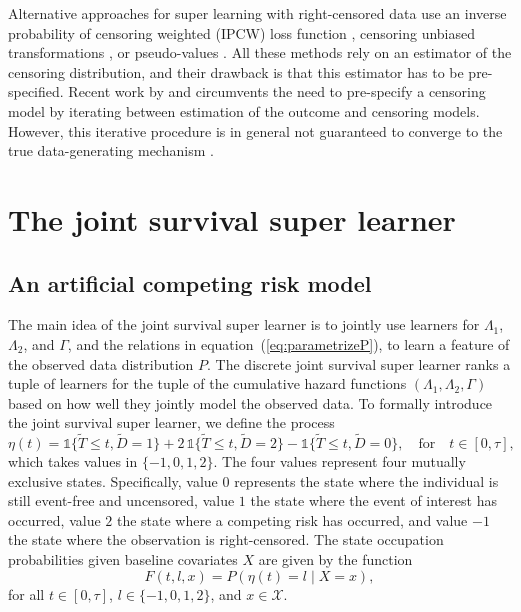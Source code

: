 \documentclass[a4paper,danish]{article}
\theoremstyle{plain} %
\numberwithin{theorem}{section}
\theoremstyle{definition} %
\theoremstyle{remark}
\newcommand{\1}{\mathds{1}}
\begin{document}
Alternative approaches for super learning with right-censored data use
an inverse probability of censoring weighted (IPCW) loss function
\citep{graf1999assessment,van2003unicv,molinaro2004tree,keles2004asymptotically,hothorn2006survival,gerds2006consistent,gonzalez2021stacked},
censoring unbiased transformations
\citep{fan1996local,steingrimsson2019censoring}, or pseudo-values
\citep{andersen2003generalised,mogensen2013random,sachs2019ensemble}.
All these methods rely on an estimator of the censoring distribution,
and their drawback is that this estimator has to be pre-specified.
Recent work by
\cite{han2021inverse} and \cite{westling2021inference} 
circumvents the need to pre-specify a censoring model by iterating
between estimation of the outcome and censoring models. However, this
iterative procedure is in general not guaranteed to converge to the
true data-generating mechanism
\citep[][Appendix~A.4]{munch2024thesis}.


\section{The joint survival super learner}
\label{sec:super-learner-simple}

\subsection{An artificial competing risk model}
\label{sec:an-artif-comp}


The main idea of the joint survival super learner is to jointly use learners for \(
\Lambda_1 \), \( \Lambda_2 \), and \( \Gamma \), and the relations in
equation~(\ref{eq:parametrizeP}), to learn a feature of the observed
data distribution \( P \). The discrete joint survival super learner ranks a tuple of
learners for the tuple of the cumulative hazard functions \(
(\Lambda_1, \Lambda_2, \Gamma) \) based on how well they jointly model
the observed data. To formally introduce the joint survival super learner, we define
the process 
\begin{equation*}
  \eta(t) = \1\{\tilde{T} \leq t, \tilde D=1\} + 2\,\1\{\tilde{T} \leq t, \tilde
  D=2\} - \1\{\tilde{T} \leq t, \tilde D=0\},
  \quad \text{for} \quad t \in [0, \tau],
\end{equation*}
which takes values in \( \{-1,0,1,2\}\). The four values
represent four mutually exclusive states. Specifically, value
\( 0 \) represents the state where the individual is still
event-free and uncensored, value \( 1\) the state where the
event of interest has occurred, value \( 2\) the state where a
competing risk has occurred, and value \( -1\) the state where
the observation is right-censored. The state occupation
probabilities given baseline covariates \( X \) are given by
the function
\begin{equation}
  \label{eq:F-def}
  F(t, l, x) = P(\eta(t) = l \mid X=x),
\end{equation}
for all \( t \in [0,\tau] \), \( l \in \{-1,0,1,2\} \), and
\( x \in \mathcal{X} \).
\end{document}
